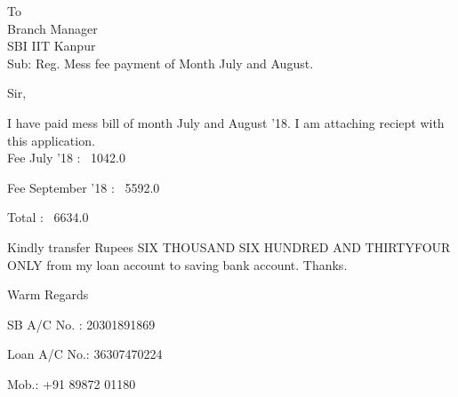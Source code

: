 \documentclass{letter}
\date{October 30, 2018}
\begin{document}
{\ttfamily
\begin{letter}{To\\ Branch Manager\\ SBI IIT Kanpur\\Sub: Reg. Mess fee payment of Month July and August. }
\opening{Sir,}
I have paid mess bill of month July and August '18. I am attaching reciept with this application.\\ Fee July '18 : \rupee~1042.0 \par Fee September '18 : \rupee~5592.0 \par \vspace{0.5em}\hline \vspace{0.1em} Total : \rupee~6634.0 \par 
 
Kindly transfer Rupees SIX THOUSAND SIX HUNDRED AND THIRTYFOUR ONLY from my loan account to saving bank account. Thanks.
\closing{Warm Regards}
SB A/C No. : 20301891869 \par 
Loan A/C No.: 36307470224\par
Mob.: +91 89872 01180\par
\end{letter}}
\end{document}
